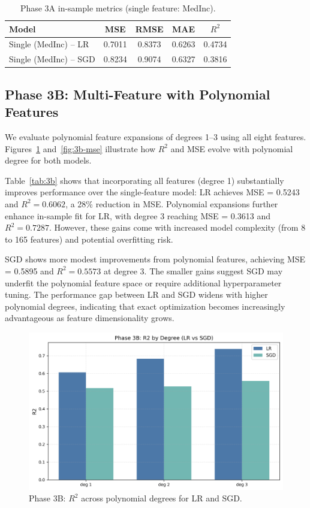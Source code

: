 \documentclass[runningheads]{llncs}
\begin{document}
\begin{table}[H]
  \centering
  \caption{Phase 3A in-sample metrics (single feature: MedInc).}
  \label{tab:3a}
  \begin{tabular}{lcccc}
    \toprule
    Model & MSE & RMSE & MAE & $R^2$ \\
    \midrule
    Single (MedInc) -- LR  & 0.7011 & 0.8373 & 0.6263 & 0.4734 \\
    Single (MedInc) -- SGD & 0.8234 & 0.9074 & 0.6327 & 0.3816 \\
    \bottomrule
  \end{tabular}
\end{table}

\subsection{Phase 3B: Multi-Feature with Polynomial Features}
We evaluate polynomial feature expansions of degrees 1--3 using all eight features. Figures~\ref{fig:3b-r2} and~\ref{fig:3b-mse} illustrate how $R^2$ and MSE evolve with polynomial degree for both models.

Table~\ref{tab:3b} shows that incorporating all features (degree 1) substantially improves performance over the single-feature model: LR achieves MSE = 0.5243 and $R^2 = 0.6062$, a 28\% reduction in MSE. Polynomial expansions further enhance in-sample fit for LR, with degree 3 reaching MSE = 0.3613 and $R^2 = 0.7287$. However, these gains come with increased model complexity (from 8 to 165 features) and potential overfitting risk.

SGD shows more modest improvements from polynomial features, achieving MSE = 0.5895 and $R^2 = 0.5573$ at degree 3. The smaller gains suggest SGD may underfit the polynomial feature space or require additional hyperparameter tuning. The performance gap between LR and SGD widens with higher polynomial degrees, indicating that exact optimization becomes increasingly advantageous as feature dimensionality grows.

\begin{figure}[H]
  \centering
  \includegraphics[width=0.9\linewidth]{data/Phase 3B R2.png}
  \caption{Phase 3B: $R^2$ across polynomial degrees for LR and SGD.}
  \label{fig:3b-r2}
\end{figure}
\end{document}
